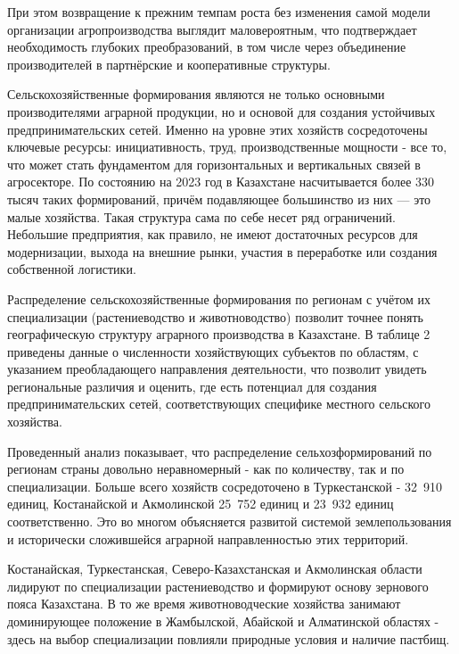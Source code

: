\begin{multicols}{2}
При этом возвращение к прежним темпам роста без изменения самой модели
организации агропроизводства выглядит маловероятным, что подтверждает
необходимость глубоких преобразований, в том числе через объединение
производителей в партнёрские и кооперативные структуры.

Сельскохозяйственные формирования являются не только основными
производителями аграрной продукции, но и основой для создания устойчивых
предпринимательских сетей. Именно на уровне этих хозяйств сосредоточены
ключевые ресурсы: инициативность, труд, производственные мощности - все
то, что может стать фундаментом для горизонтальных и вертикальных связей
в агросекторе. По состоянию на 2023 год в Казахстане насчитывается более
330 тысяч таких формирований, причём подавляющее большинство из них ---
это малые хозяйства. Такая структура сама по себе несет ряд ограничений.
Небольшие предприятия, как правило, не имеют достаточных ресурсов для
модернизации, выхода на внешние рынки, участия в переработке или
создания собственной логистики.

Распределение сельскохозяйственные формирования по регионам с учётом их
специализации (растениеводство и животноводство) позволит точнее понять
географическую структуру аграрного производства в Казахстане. В таблице
2 приведены данные о численности хозяйствующих субъектов по областям, с
указанием преобладающего направления деятельности, что позволит увидеть
региональные различия и оценить, где есть потенциал для создания
предпринимательских сетей, соответствующих специфике местного сельского
хозяйства.

Проведенный анализ показывает, что распределение сельхозформирований по
регионам страны довольно неравномерный - как по количеству, так и по
специализации. Больше всего хозяйств сосредоточено в Туркестанской -
32~910 единиц, Костанайской и Акмолинской 25~752 единиц и 23~932 единиц
соответственно. Это во многом объясняется развитой системой
землепользования и исторически сложившейся аграрной направленностью этих
территорий.

Костанайская, Туркестанская, Северо-Казахстанская и Акмолинская области
лидируют по специализации растениеводство и формируют основу зернового
пояса Казахстана. В то же время животноводческие хозяйства занимают
доминирующее положение в Жамбылской, Абайской и Алматинской областях -
здесь на выбор специализации повлияли природные условия и наличие
пастбищ.
\end{multicols}

